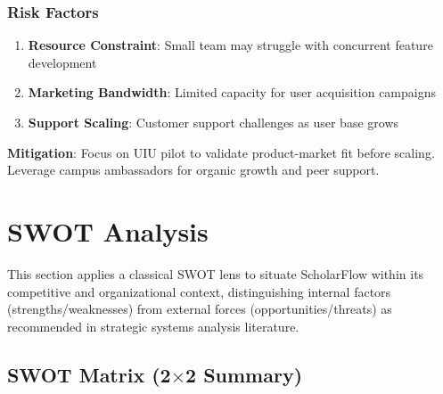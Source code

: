 \subsubsection{Risk Factors}
\begin{enumerate}
    \item \textbf{Resource Constraint}: Small team may struggle with concurrent feature development
    \item \textbf{Marketing Bandwidth}: Limited capacity for user acquisition campaigns
    \item \textbf{Support Scaling}: Customer support challenges as user base grows
\end{enumerate}

\textbf{Mitigation}: Focus on UIU pilot to validate product-market fit before scaling. Leverage campus ambassadors for organic growth and peer support.

\section{SWOT Analysis}

This section applies a classical SWOT lens to situate ScholarFlow within its competitive and organizational context, distinguishing internal factors (strengths/weaknesses) from external forces (opportunities/threats) as recommended in strategic systems analysis literature.

\subsection{SWOT Matrix (2\texorpdfstring{$\times$}{x}2 Summary)}

